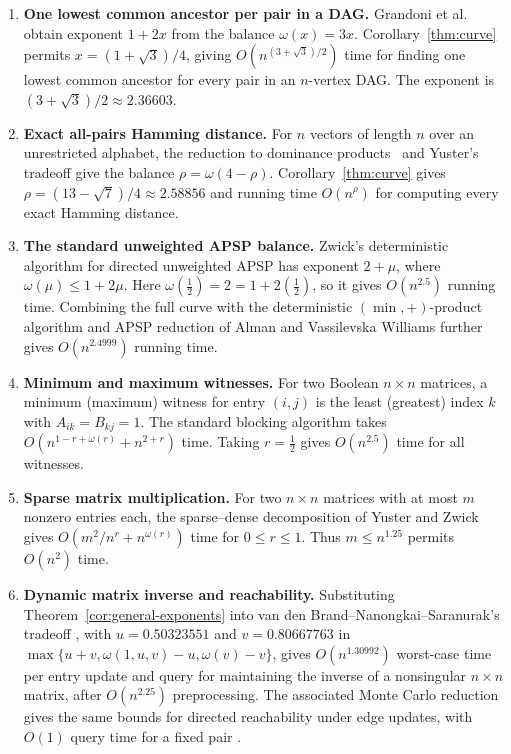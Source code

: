 \documentclass[11pt]{article}
\begin{document}
\begin{enumerate}
\item \textbf{One lowest common ancestor per pair in a DAG.}
Grandoni et al.\ \cite[Theorem~4.2 of the published version]
{grandoni-et-al-2021-all-pairs-lca} obtain exponent $1+2x$ from the
balance $\omega(x)=3x$. Corollary~\ref{thm:curve} permits
$x=(1+\sqrt3)/4$, giving
$O(n^{(3+\sqrt3)/2})$ time for finding one lowest common
ancestor for every pair in an $n$-vertex DAG. The exponent is
$(3+\sqrt3)/2\approx2.36603$.

\item \textbf{Exact all-pairs Hamming distance.}
For $n$ vectors of length $n$ over an unrestricted alphabet, the
reduction to dominance products~\cite{labib-uznanski-wolleb-graf-2019}
and Yuster's tradeoff
\cite[Proposition~2.1]{yuster-2009-permutations-dominance} give the balance
$\rho=\omega(4-\rho)$.
Corollary~\ref{thm:curve} gives
$\rho=(13-\sqrt7)/4\approx2.58856$ and running time
$O(n^\rho)$ for computing every exact Hamming distance.

\item \textbf{The standard unweighted APSP balance.}
Zwick's deterministic algorithm for directed unweighted APSP
\cite[Section~6]{zwick-2002-bridging-sets} has exponent $2+\mu$,
where $\omega(\mu)\le1+2\mu$. Here $\omega(\frac{1}{2})=2=1+2(\frac{1}{2})$,
so it gives $O(n^{2.5})$ running time.
Combining the full curve with the deterministic $(\min,+)$-product
algorithm and APSP reduction of Alman and Vassilevska Williams
\cite[Theorems~22 and~33--34]{alman-williams-2026} further gives
$O(n^{2.4999})$ running time.
\item \textbf{Minimum and maximum witnesses.}
For two Boolean $n\times n$ matrices, a minimum (maximum) witness for
entry $(i,j)$ is the least (greatest) index $k$ with $A_{ik}=B_{kj}=1$.
The standard blocking algorithm
\cite[Section~2.1]{cohen-yuster-2014-minimum-witnesses} takes
$O(n^{1-r+\omega(r)}+n^{2+r})$ time.
Taking $r=\frac{1}{2}$ gives $O(n^{2.5})$ time for all witnesses.

\item \textbf{Sparse matrix multiplication.}
For two $n\times n$ matrices with at most $m$ nonzero entries each,
the sparse--dense decomposition of Yuster and Zwick
\cite[Section~3]{yuster-zwick-2005-sparse} gives
$O(m^2/n^r+n^{\omega(r)})$ time for $0\le r\le1$.
Thus $m\le n^{1.25}$ permits $O(n^2)$ time.

\item \textbf{Dynamic matrix inverse and reachability.}
Substituting Theorem~\ref{cor:general-exponents} into van den
Brand--Nanongkai--Saranurak's tradeoff
\cite[Theorem~4.2]{van-den-brand-nanongkai-saranurak-2019}, with
$u=0.50323551$ and $v=0.80667763$ in
$\max\{u+v,\omega(1,u,v)-u,\omega(v)-v\}$,
gives $O(n^{1.30992})$ worst-case time per entry update and query for
maintaining the inverse of a nonsingular $n\times n$ matrix, after
$O(n^{2.25})$ preprocessing.
The associated Monte Carlo reduction gives the same bounds for directed
reachability under edge updates, with $O(1)$ query time for a fixed pair
\cite[Corollary~C.12 and Theorem~C.16]{van-den-brand-nanongkai-saranurak-2019}.
\end{enumerate}
\end{document}

